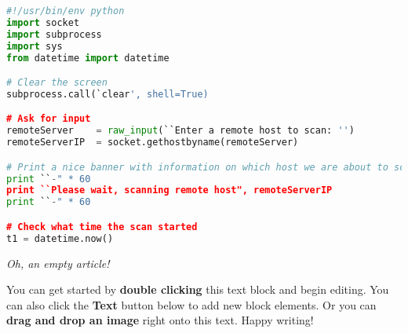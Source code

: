 \begin{lstlisting}[language=python] 
#!/usr/bin/env python
import socket
import subprocess
import sys
from datetime import datetime

# Clear the screen
subprocess.call(`clear', shell=True)

# Ask for input
remoteServer    = raw_input(``Enter a remote host to scan: '')
remoteServerIP  = socket.gethostbyname(remoteServer)

# Print a nice banner with information on which host we are about to scan
print ``-" * 60
print ``Please wait, scanning remote host", remoteServerIP
print ``-" * 60

# Check what time the scan started
t1 = datetime.now()
\end{lstlisting}

\textit{Oh, an empty article!} 

You can get started by \textbf{double clicking} this text block and begin editing. You can also click the \textbf{Text} button below to add new block elements. Or you can \textbf{drag and drop an image} right onto this text. Happy writing!